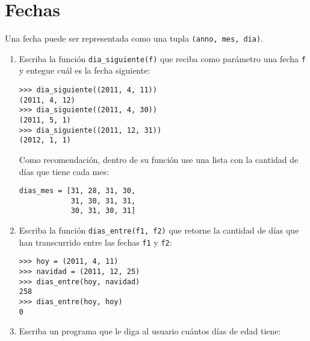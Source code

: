 \section{Fechas}

Una fecha puede ser representada como una tupla
\lstinline!(anno, mes, dia)!.

\begin{enumerate}[1.]
\item
  Escriba la función \lstinline!dia_siguiente(f)! que reciba como
  parámetro una fecha \lstinline!f! y entegue cuál es la fecha
  siguiente:

\begin{lstlisting}
>>> dia_siguiente((2011, 4, 11))
(2011, 4, 12)
>>> dia_siguiente((2011, 4, 30))
(2011, 5, 1)
>>> dia_siguiente((2011, 12, 31))
(2012, 1, 1)
\end{lstlisting}

  Como recomendación, dentro de su función use una lista con la cantidad
  de días que tiene cada mes:

\begin{lstlisting}
dias_mes = [31, 28, 31, 30,
            31, 30, 31, 31,
            30, 31, 30, 31]
\end{lstlisting}
\item
  Escriba la función \lstinline!dias_entre(f1, f2)! que retorne la
  cantidad de días que han transcurrido entre las fechas \lstinline!f1!
  y \lstinline!f2!:

\begin{lstlisting}
>>> hoy = (2011, 4, 11)
>>> navidad = (2011, 12, 25)
>>> dias_entre(hoy, navidad)
258
>>> dias_entre(hoy, hoy)
0
\end{lstlisting}
\item
  Escriba un programa que le diga al usuario cuántos días de edad tiene:
\end{enumerate}
